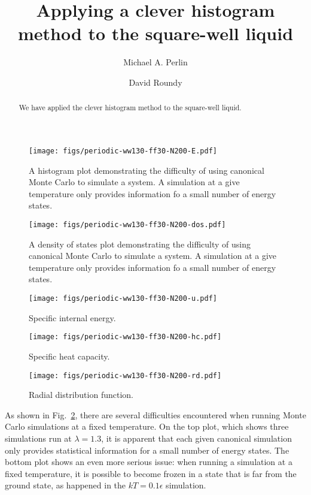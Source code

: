 \documentclass[letterpaper,twocolumn,amsmath,amssymb,pre,aps,10pt]{revtex4-1}
\begin{document}
\title{Applying a clever histogram method to the square-well liquid}

\author{Michael A. Perlin}
\author{David Roundy}

\begin{abstract}
  We have applied the clever histogram method to the square-well liquid.
\end{abstract}

\maketitle

\begin{figure}
  \texttt{[image: figs/periodic-ww130-ff30-N200-E.pdf]}
  \caption{A histogram plot demonstrating the difficulty of using
    canonical Monte Carlo to simulate a system.  A simulation at a
    give temperature only provides information fo a small number of
    energy states.\label{fig:histograms}}
\end{figure}

\begin{figure}
  \texttt{[image: figs/periodic-ww130-ff30-N200-dos.pdf]}
  \caption{A density of states plot demonstrating the difficulty of using
    canonical Monte Carlo to simulate a system.  A simulation at a
    give temperature only provides information fo a small number of
    energy states.\label{fig:histograms}}
\end{figure}

\begin{figure}
  \texttt{[image: figs/periodic-ww130-ff30-N200-u.pdf]}
  \caption{Specific internal energy.\label{fig:u}}
\end{figure}

\begin{figure}
  \texttt{[image: figs/periodic-ww130-ff30-N200-hc.pdf]}
  \caption{Specific heat capacity.\label{fig:hc}}
\end{figure}

\begin{figure}
  \texttt{[image: figs/periodic-ww130-ff30-N200-rd.pdf]}
  \caption{Radial distribution function.\label{fig:rdf}}
\end{figure}

As shown in Fig.~\ref{fig:histograms}, there are several difficulties
encountered when running Monte Carlo simulations at a fixed
temperature.  On the top plot, which shows three simulations run at
$\lambda = 1.3$, it is apparent that each given canonical simulation
only provides statistical information for a small number of energy
states.  The bottom plot shows an even more serious issue:  when
running a simulation at a fixed temperature, it is possible to become
frozen in a state that is far from the ground state, as happened in
the $kT=0.1\epsilon$ simulation.
\end{document}
